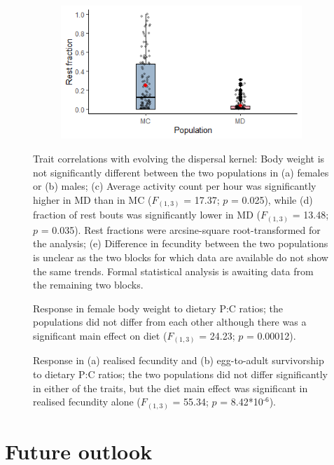 \documentclass[12pt,onecolumn,twoside]{article}
\begin{document}
\begin{figure}
\begin{subfigure}{0.49\textwidth}
			\subcaption{\empty}
		\end{subfigure}
		\begin{subfigure}{0.49\textwidth}
			\includegraphics[width=\textwidth, keepaspectratio]{fig1f.png}
			\subcaption{\empty}
		\end{subfigure}
		\begin{subfigure}{0.49\textwidth}
			\centering
			\scalebox{0.6}{}
			\subcaption{\empty}
		\end{subfigure}
		\caption{\label{fig2} Trait correlations with evolving the dispersal kernel: Body weight is not significantly different between the two populations in (a) females or (b) males; (c) Average activity count per hour was significantly higher in MD than in MC ($F_{(1, 3)}$ = 17.37; $p$ = 0.025), while (d) fraction of rest bouts was significantly lower in MD ($F_{(1, 3)}$ = 13.48; $p$ = 0.035). Rest fractions were arcsine-square root-transformed for the analysis; (e) Difference in fecundity between the two populations is unclear as the two blocks for which data are available do not show the same trends. Formal statistical analysis is awaiting data from the remaining two blocks.}
	\end{figure}
	\begin{figure}
		\centering
		\scalebox{0.7}{}
		\caption{\label{fig3} Response in female body weight to dietary P:C ratios; the populations did not differ from each other although there was a significant main effect on diet ($F_{(1, 3)}$ = 24.23; $p$ = 0.00012).}
	\end{figure}
	\begin{figure}
		\centering
		\begin{subfigure}{\textwidth}
			\scalebox{0.35}{}
			\subcaption{\empty}
		\end{subfigure}
		\begin{subfigure}{\textwidth}
			\scalebox{0.35}{}
			\subcaption{\empty}
		\end{subfigure}
		\caption{\label{fig4} Response in (a) realised fecundity and (b) egg-to-adult survivorship to dietary P:C ratios; the two populations did not differ significantly in either of the traits, but the diet main effect was significant in realised fecundity alone ($F_{(1, 3)}$ = 55.34; $p$ = 8.42*10$^{\text{-6}}$).}
	\end{figure}
	\section{Future outlook}

	
	
\end{document}
